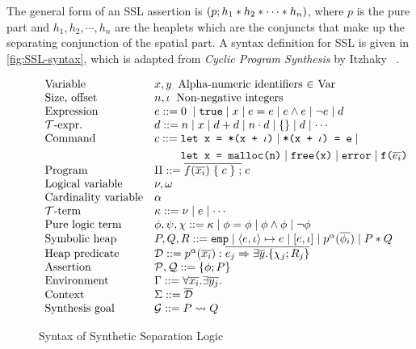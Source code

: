 \noindent
The general form of an SSL assertion is
$(p; h_1 * h_2 * \cdots * h_n)$, where $p$ is the pure part
and $h_1, h_2, \cdots, h_n$ are the heaplets which are the conjuncts
that make up the separating conjunction of the spatial part. A syntax
definition for SSL is given in \autoref{fig:SSL-syntax}, which is
adapted from \textit{Cyclic Program Synthesis} by Itzhaky
\etal~\cite{itzhaky:2021:cyclic-synth}.

\begin{figure}[t]
\setlength{\abovecaptionskip}{5pt}
{\small{
\[
  \begin{array}[t]{ l l }
    \text{Variable} &x, y\;\; \text{Alpha-numeric identifiers $\in$ \textnormal{Var}}\\
    \text{Size, offset} &n, \iota\;\; \text{Non-negative integers}\\
    \text{Expression} &e ::= 0\; \mid \texttt{true} \mid x \mid e = e \mid e \land e \mid \neg e \mid d\\
    \text{$\mathcal{T}$-expr.} &d ::= n \mid x \mid d + d \mid n \cdot d \mid \{\} \mid {d} \mid \cdots\\
    \text{Command} &c ::= \begin{aligned}[t] &\texttt{let x = *(x + }\iota\texttt{)} \mid \texttt{*(x + }\iota\texttt{) = e} \mid
      \\
      &\texttt{let x = malloc(n)} \mid \texttt{free(x)} \mid \texttt{error}\newline
      \mid \texttt{f(}\overline{e_i}\texttt{)}
      \end{aligned}\\
    \text{Program} &\Pi ::= \overline{f(\overline{x_i})\; \{\; c\; \}\; ;}\; c\\
    \text{Logical variable} &\nu, \omega\\
    \text{Cardinality variable} &\alpha\\
    \text{$\mathcal{T}$-term} &\kappa ::= \nu \mid e \mid \cdots\\
    \text{Pure logic term} &\phi, \psi, \chi ::= \kappa \mid \phi = \phi \mid \phi \land \phi \mid \neg \phi\\
    \text{Symbolic heap} &P, Q, R ::= \texttt{emp} \mid \mbox{$\langle e, \iota \rangle \mapsto e \mid [e, \iota]$} \mid p^{\alpha}(\overline{\phi_i})
      \mid \mbox{$P * Q$}\\
    \text{Heap predicate} &\mathcal{D} ::= p^{\alpha}(\overline{x_i}) : \overline{e_j \Ra \exists \overline{y}.\{\chi_j;R_j\}}\\
    \text{Assertion} &\mathcal{P},\mathcal{Q} ::= \{\phi; P\}\\
    \text{Environment} &\Gamma ::= \forall\overline{x_i}.\exists\overline{y_j}.\\
    \text{Context} &\Sigma ::= \overline{\mathcal{D}}\\
    \text{Synthesis goal} &\mathcal{G} ::= P \leadsto Q
  \end{array}
\]
}}
\caption{Syntax of Synthetic Separation Logic}
  \label{fig:SSL-syntax}
\end{figure}

